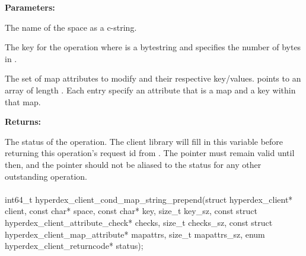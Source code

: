 \noindent\textbf{Parameters:}
\begin{description}[labelindent=\widthof{{\code{mapattrs}, \code{mapattrs\_sz}}},leftmargin=*,noitemsep,nolistsep,align=right]
\item[\code{space}] The name of the space as a c-string.
\item[\code{key}, \code{key\_sz}] The key for the operation where  is a bytestring and  specifies the number of bytes in .
\item[\code{mapattrs}, \code{mapattrs\_sz}] The set of map attributes to modify and their respective key/values.   points to an array of length .  Each entry specify an attribute that is a map and a key within that map.
\end{description}

\noindent\textbf{Returns:}
\begin{description}[labelindent=\widthof{{\code{status}}},leftmargin=*,noitemsep,nolistsep,align=right]
\item[\code{status}] The status of the operation.  The client library will fill in this variable before returning this operation's request id from .  The pointer must remain valid until then, and the pointer should not be aliased to the status for any other outstanding operation.
\end{description}

\paragraph{}
\label{api:c:cond_map_string_prepend}
\begin{ccode}
int64_t hyperdex_client_cond_map_string_prepend(struct hyperdex_client* client,
        const char* space,
        const char* key, size_t key_sz,
        const struct hyperdex_client_attribute_check* checks, size_t checks_sz,
        const struct hyperdex_client_map_attribute* mapattrs, size_t mapattrs_sz,
        enum hyperdex_client_returncode* status);
\end{ccode}
\funcdesc 

